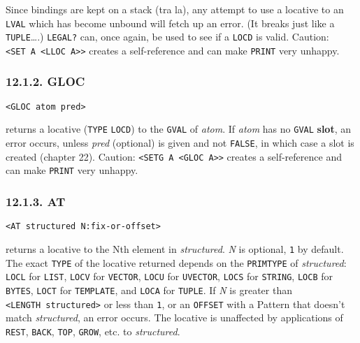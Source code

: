 \documentclass[a4paper,]{article}
\begin{document}
Since bindings are kept on a stack (tra la), any attempt to use a locative to an \texttt{LVAL} which has become unbound
will fetch up an error. (It breaks just like a \texttt{TUPLE}\ldots{}.) \texttt{LEGAL?}  can, once
again, be used to see if a \texttt{LOCD} is valid. Caution:
\texttt{\textless{}SET\ A\ \textless{}LLOC\ A\textgreater{}\textgreater{}} creates a self-reference and can make
\texttt{PRINT} very unhappy.

\subsubsection{12.1.2. GLOC}\label{gloc}

\begin{verbatim}
<GLOC atom pred>
\end{verbatim}

 returns a locative (\texttt{TYPE} \texttt{LOCD}) to the \texttt{GVAL} of
\emph{atom}. If \emph{atom} has no \texttt{GVAL}  \textbf{slot}, an error occurs, unless \emph{pred}
(optional) is given and not \texttt{FALSE}, in which case a slot is created (chapter 22). Caution:
\texttt{\textless{}SETG\ A\ \textless{}GLOC\ A\textgreater{}\textgreater{}} creates a self-reference and can make
\texttt{PRINT} very unhappy.

\subsubsection{12.1.3. AT}\label{at}

\begin{verbatim}
<AT structured N:fix-or-offset>
\end{verbatim}

 returns a locative to the Nth element in \emph{structured}. \emph{N} is optional, \texttt{1} by
default. The exact \texttt{TYPE} of the locative returned depends on the \texttt{PRIMTYPE} of \emph{structured}:
\texttt{LOCL}  for \texttt{LIST}, \texttt{LOCV}  for
\texttt{VECTOR}, \texttt{LOCU}  for \texttt{UVECTOR}, \texttt{LOCS}
 for \texttt{STRING}, \texttt{LOCB}  for \texttt{BYTES},
\texttt{LOCT}  for \texttt{TEMPLATE}, and \texttt{LOCA}  for
\texttt{TUPLE}. If \emph{N} is greater than \texttt{\textless{}LENGTH\ structured\textgreater{}} or less than \texttt{1},
or an \texttt{OFFSET} with a Pattern that doesn't match \emph{structured}, an error occurs. The locative is unaffected by
applications of \texttt{REST}, \texttt{BACK}, \texttt{TOP}, \texttt{GROW}, etc. to \emph{structured}.
\end{document}
